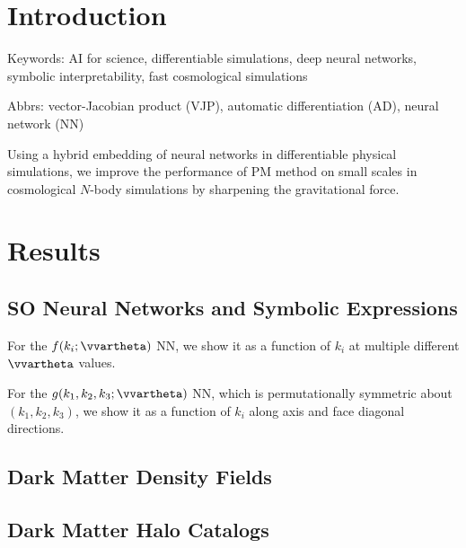 \documentclass[modern, trackchanges, dvipsnames]{aastex631}
\begin{document}
\vspace{1em}
\section{Introduction}
Keywords: AI for science, differentiable simulations, deep neural networks,
symbolic interpretability, fast cosmological simulations

Abbrs: vector-Jacobian product (VJP), automatic differentiation (AD), neural
network (NN)

Using a hybrid embedding of neural networks in differentiable physical
simulations, we improve the performance of PM method on small scales in
cosmological $N$-body simulations by sharpening the gravitational force.


\vspace{1em}
\section{Results}

\subsection{SO Neural Networks and Symbolic Expressions}

For the $f(k_i; \vvartheta)$ NN, we show it as a function of $k_i$ at multiple
different $\vvartheta$ values.

For the $g(k_1,k_2,k_3;\vvartheta)$ NN, which is permutationally symmetric about
$(k_1, k_2, k_3)$, we show it as a function of $k_i$ along axis and face
diagonal directions.


\subsection{Dark Matter Density Fields}




\subsection{Dark Matter Halo Catalogs}
\end{document}
